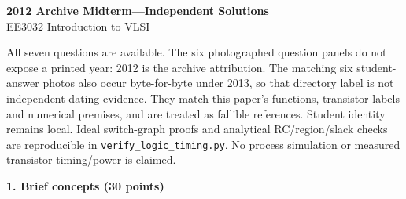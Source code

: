 \documentclass[10pt]{article}
\newcommand{\qheading}[1]{\par\medskip\textbf{#1}\par}
\begin{document}
\begin{center}{\Large\bfseries 2012 Archive Midterm---Independent Solutions}\\EE3032 Introduction to VLSI\end{center}
All seven questions are available. The six photographed question panels do not expose a printed year: 2012 is the archive attribution. The matching six student-answer photos also occur byte-for-byte under 2013, so that directory label is not independent dating evidence. They match this paper's functions, transistor labels and numerical premises, and are treated as fallible references. Student identity remains local.
Ideal switch-graph proofs and analytical RC/region/slack checks are reproducible in \texttt{verify\_logic\_timing.py}. No process simulation or measured transistor timing/power is claimed.
\qheading{1. Brief concepts (30 points)}
\end{document}
